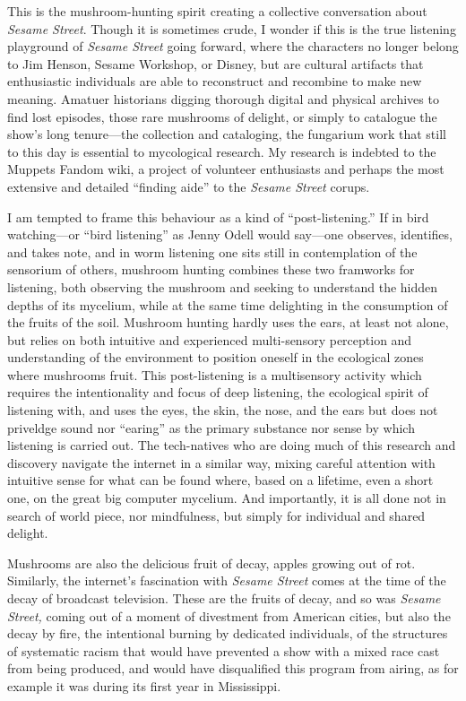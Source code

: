 \documentclass[12pt,letterpaper]{article}
\newcommand{\ses}{\textit{Sesame Street }}
\begin{document}
	This is the mushroom-hunting spirit creating a collective conversation 
	about \textit{Sesame Street}. Though it is sometimes crude, I 
	wonder if this is the true listening playground of \ses going forward, 
	where the characters no longer belong to Jim Henson, Sesame Workshop, or
	Disney, but are cultural artifacts that enthusiastic individuals are 
	able to reconstruct and recombine to make new meaning. Amatuer 
	historians digging thorough digital and physical archives to find lost 
	episodes, those rare mushrooms of delight, or simply to catalogue the 
	show's long tenure---the collection and cataloging, the fungarium work 
	that still to this day is essential to mycological research. My research
	is indebted to the Muppets Fandom wiki, a project of volunteer 
	enthusiasts and perhaps the most extensive and detailed ``finding aide''
	to the \ses corups. 

	I am tempted to frame this behaviour as a kind of ``post-listening.'' If
	in bird watching---or ``bird listening'' as Jenny Odell would say---one
	observes, identifies, and takes note, and in worm listening one sits 
	still in contemplation of the sensorium of others, mushroom hunting 
	combines these two framworks for listening, both observing the mushroom 
	and seeking to understand the hidden depths of its mycelium, while at 
	the same time delighting in the consumption of the fruits of the soil. 
	Mushroom hunting hardly uses the ears, at least not alone, but relies on
	both intuitive and experienced multi-sensory perception and 
	understanding of the environment to position oneself in the ecological 
	zones where mushrooms fruit. This post-listening is a multisensory 
	activity which requires the intentionality and focus of deep listening, 
	the ecological spirit of listening with, and uses the eyes, the 
	skin, the nose, and the ears but does not priveldge sound nor ``earing''
	as the primary substance nor sense by which listening is carried out. 
	The tech-natives who are doing much of this research 
	and discovery navigate the internet in a similar way, mixing careful 
	attention with intuitive sense for what can be found where, based on a 
	lifetime, even a short one, on the great big computer mycelium. And
	importantly, it is all done not in search of world piece, nor 
	mindfulness, but simply for individual and shared delight. 

	Mushrooms are also the delicious fruit of decay, apples growing out of 
	rot. Similarly, the internet's fascination with \ses comes at 
	the time of the decay of broadcast television. These are the 
	fruits of decay, and so was \textit{Sesame Street,} coming out of a 
	moment of divestment from American cities, but also the decay by fire, 
	the intentional burning by dedicated individuals, of the structures of 
	systematic racism that would have prevented a show with a mixed race 
	cast from being produced, and would have disqualified this program from
	airing, as for example it was during its first year in 
	Mississippi.\autocite[201]{Davis} 
\end{document}
